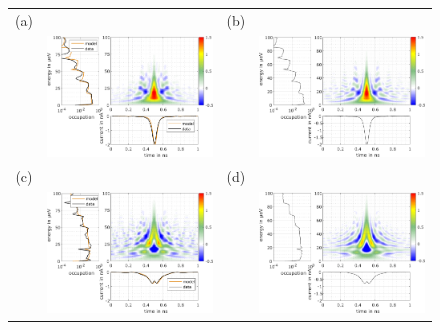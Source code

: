 \begin{figure}[hptb]
	\begin{center}
		\begin{tabular}{c c c c}
			
			(a) & & (b) &  \\ 
			& \includegraphics[width = 6.5 cm]{./chap1/wannierwigData_leviton_40ps_2e_51mK_Projected_Gradient_Method-el-0} &
			& \includegraphics[width = 6.5 cm]{./chap1/wannierwigTheory_leviton_40ps_2e_51mK-el-0} \\
			(c) & & (d) &  \\ 
			& \includegraphics[width = 6.5 cm]{./chap1/wannierwigData_leviton_40ps_2e_51mK_Projected_Gradient_Method-el-1} &
			& \includegraphics[width = 6.5 cm]{./chap1/wannierwigTheory_leviton_40ps_2e_51mK-el-1} \\

\end{tabular}
\end{center}
\end{figure}
